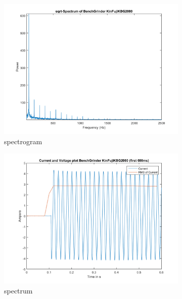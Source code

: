 \documentclass[portrait,a0b,posterdraft]{a0poster}
\begin{document}
{\begin{figure}
\begin{subfigure}{.1\textwidth}
\centering
\includegraphics[width=\linewidth]{BenchGrinder_KinFujiKBG2080_spectrum.png}
\caption{spectrogram}
\end{subfigure}
\begin{subfigure}{.1\textwidth}
\centering
\includegraphics[width=\linewidth]{BenchGrinder_KinFujiKBG2080_timeDomainShort.png}
\caption{spectrum}
\end{subfigure}
\begin{subfigure}{.1\textwidth}
\centering

\end{subfigure}
\end{figure}}
\end{document}
